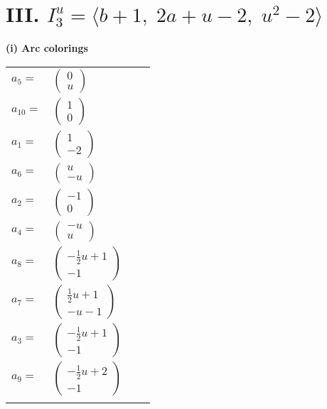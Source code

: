 \documentclass[1p]{elsarticle_modified}
\theoremstyle{definition}
\begin{document}
\centering \section*{III. $I^u_{3}= \langle b+1,\;2 a+u-2,\;u^2-2 \rangle$}
\flushleft \textbf{(i) Arc colorings}\\
\begin{tabular}{m{7pt} m{180pt} m{7pt} m{180pt} }
\flushright $a_{5}=$&$\begin{pmatrix}0\\u\end{pmatrix}$ \\
\flushright $a_{10}=$&$\begin{pmatrix}1\\0\end{pmatrix}$ \\
\flushright $a_{1}=$&$\begin{pmatrix}1\\-2\end{pmatrix}$ \\
\flushright $a_{6}=$&$\begin{pmatrix}u\\- u\end{pmatrix}$ \\
\flushright $a_{2}=$&$\begin{pmatrix}-1\\0\end{pmatrix}$ \\
\flushright $a_{4}=$&$\begin{pmatrix}- u\\u\end{pmatrix}$ \\
\flushright $a_{8}=$&$\begin{pmatrix}-\frac{1}{2} u+1\\-1\end{pmatrix}$ \\
\flushright $a_{7}=$&$\begin{pmatrix}\frac{1}{2} u+1\\- u-1\end{pmatrix}$ \\
\flushright $a_{3}=$&$\begin{pmatrix}-\frac{1}{2} u+1\\-1\end{pmatrix}$ \\
\flushright $a_{9}=$&$\begin{pmatrix}-\frac{1}{2} u+2\\-1\end{pmatrix}$\\&\end{tabular}
\end{document}
